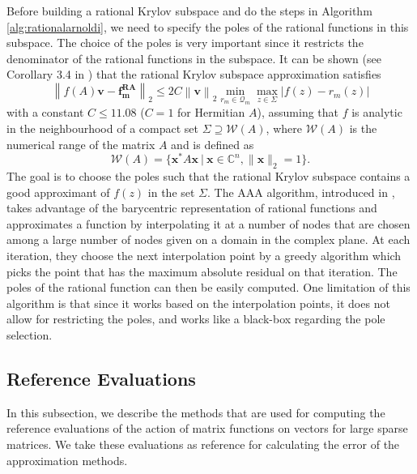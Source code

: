 Before building a rational Krylov subspace and do the steps in Algorithm \ref{alg:rationalarnoldi},
we need to specify the poles of the rational functions in this subspace.
The choice of the poles is very important since it restricts the denominator of the rational
functions in the subspace. It can be shown (see Corollary 3.4 in \cite{guttel2013rational}) that
the rational Krylov subspace approximation satisfies
\begin{equation*}
    \left\| f(A)\mathbf{v} - \mathbf{f_m^{RA}}  \right\|_2 \le 2 C \left\| \mathbf{v} \right\|_2
    \min_{r_m \in \mathcal{Q}_{m}} \max_{z \in \Sigma} | f(z) - r_m(z) |
\end{equation*}
with a constant $C \le 11.08$ ($C = 1$ for Hermitian $A$), assuming that $f$ is analytic in
the neighbourhood of a compact set $\Sigma \supseteq \mathcal{W}(A)$, where $\mathcal{W}(A)$
is the numerical range of the matrix $A$ and is defined as
\begin{equation}
    \label{eq:numericalrange}
    \mathcal{W}(A) = \{\mathbf{x^*} A \mathbf{x} \:|\: \mathbf{x} \in \mathbb{C}^{n}, \|\mathbf{x}\|_2=1\}.
\end{equation}
The goal is to choose the poles such that the rational Krylov subspace contains a good approximant
of $f(z)$ in the set $\Sigma$.
The AAA algorithm, introduced in \cite{nakatsukasa2018AAA}, takes advantage of the barycentric
representation of rational functions and approximates a function by interpolating it at a number
of nodes that are chosen among a large number of nodes given on a domain in the complex plane.
At each iteration, they choose the next interpolation point by a greedy algorithm which picks
the point that has the maximum absolute residual on that iteration. The poles of the rational
function can then be easily computed.
One limitation of this algorithm is that since it works based on the interpolation points,
it does not allow for restricting the poles, and works like a black-box regarding the pole selection.

\subsection{Reference Evaluations}
\label{sec:exactevaluation}

In this subsection, we describe the methods that are used for computing the reference
evaluations of the action of matrix functions on vectors for large sparse matrices.
We take these evaluations as reference for calculating the error of the approximation methods.


